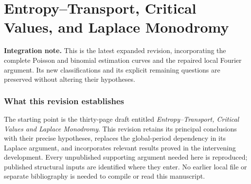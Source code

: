 \documentclass[11pt,a4paper]{article}
\theoremstyle{definition}
\theoremstyle{remark}
\numberwithin{equation}{section}
\newcommand{\collectedpart}[1]{%
 \clearpage\part{#1}%
 \setcounter{section}{0}%
 \renewcommand{\thesection}{\Roman{part}.\arabic{section}}%
 \renewcommand{\theHsection}{p\arabic{part}.s\arabic{section}}%
 \renewcommand{\arraystretch}{1}%
}
\begin{document}
\endgroup


\collectedpart{Entropy--Transport, Critical Values, and Laplace Monodromy}\label{part:8}

\begin{abstract}
This expanded revision supplies proofs for several remaining ranges and
extends the structural conclusions of the preceding manuscript.
For Chebyshev coefficients in the Bernstein basis, we prove that
$\log 2$ is the optimal universal exponential constant when an absolute
multiplicative prefactor is allowed, and determine the exact exponential
profile in proportional and moderate degrees. Incorporating the previously
established full estimation curves closes the Poisson support transition
and the worst-null binomial testing transition.
We classify the minimum recurrence width of every arithmetic subsequence
of every nontrivially weighted binomial-power sum, and identify the entire
space of algebraic-number-valued Ap\'ery limits. A local Fourier-transform
argument replaces an insufficiently specified global-period input and
gives an iterated monodromy annihilator bound. Applications determine
exact Bessel determinant modules and algebraic relations among initial
derivatives; for bounded-height tableau exponential generating functions,
the arithmetic conclusions hold at every nonzero algebraic argument.
Finally, for positive rational beta parameters with integral sum, arbitrary
algebraic cuts, and positive algebraic polynomial tilts, a two-interval
Angelesco polynomial has algebraic coefficients exactly in the polynomial
weight case or on the diagonal of its multi-index.
The earlier results used in the revision are distinguished from the new
extensions, and the unresolved statements are listed explicitly.
\end{abstract}

\noindent\textbf{Integration note.} This is the latest expanded revision, incorporating the complete Poisson and binomial estimation curves and the repaired local Fourier argument. Its new classifications and its explicit remaining questions are preserved without altering their hypotheses.
\clearpage

\section{What this revision establishes}
\label{p8:intro:revision}

The starting point is the thirty-page draft entitled
\emph{Entropy--Transport, Critical Values and Laplace Monodromy}.
This revision retains its principal conclusions with their precise
hypotheses, replaces the global-period dependency in its Laplace argument,
and incorporates relevant results proved in the intervening development.
Every unpublished supporting argument needed here is reproduced; published
structural inputs are identified where they enter. No earlier local file
or separate bibliography is needed to compile or read this manuscript.
\end{document}
